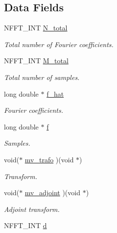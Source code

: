 \subsection*{Data Fields}
\begin{DoxyCompactItemize}
\item 
N\-F\-F\-T\-\_\-\-I\-N\-T \hyperlink{structnfstl__plan_a137fba4308a554e64ca0fb20d1e1fde5}{N\-\_\-total}
\begin{DoxyCompactList}\small\item\em Total number of Fourier coefficients. \end{DoxyCompactList}\item 
N\-F\-F\-T\-\_\-\-I\-N\-T \hyperlink{structnfstl__plan_a7ad9bc25c224f2cd3eed37e594824f9c}{M\-\_\-total}
\begin{DoxyCompactList}\small\item\em Total number of samples. \end{DoxyCompactList}\item 
long double $\ast$ \hyperlink{structnfstl__plan_aa0a56037700b7a3d428c77e353dc209e}{f\-\_\-hat}
\begin{DoxyCompactList}\small\item\em Fourier coefficients. \end{DoxyCompactList}\item 
long double $\ast$ \hyperlink{structnfstl__plan_ad4f7ff9f286c0203712d5f16b21e9e4e}{f}
\begin{DoxyCompactList}\small\item\em Samples. \end{DoxyCompactList}\item 
void($\ast$ \hyperlink{structnfstl__plan_adbe7e6be1061160223c10b6567efda40}{mv\-\_\-trafo} )(void $\ast$)
\begin{DoxyCompactList}\small\item\em Transform. \end{DoxyCompactList}\item 
void($\ast$ \hyperlink{structnfstl__plan_a1eca782b8267b78a6effc382c0a5b9f4}{mv\-\_\-adjoint} )(void $\ast$)
\begin{DoxyCompactList}\small\item\em Adjoint transform. \end{DoxyCompactList}\item 
\hypertarget{structnfstl__plan_aadb3d20fbf92d8650aed4363d4f6c375}{N\-F\-F\-T\-\_\-\-I\-N\-T \hyperlink{structnfstl__plan_aadb3d20fbf92d8650aed4363d4f6c375}{d}}\label{structnfstl__plan_aadb3d20fbf92d8650aed4363d4f6c375}


\end{DoxyCompactItemize}
